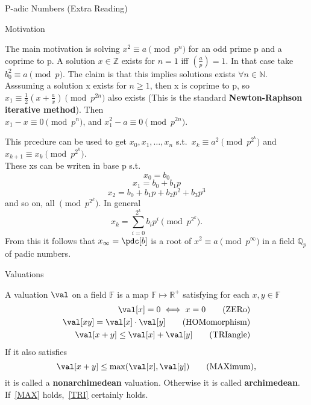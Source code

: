\documentclass[12pt, letterpaper]{article}
\newcommand{\R}{\mathbb{R}}
\newcommand{\Q}{\mathbb{Q}}
\newcommand{\Z}{\mathbb{Z}}
\newcommand{\F}{\mathbb{F}}
\newcommand{\N}{\mathbb{N}}
\begin{document}
\begin{section}{P-adic Numbers (Extra Reading)}

  \begin{subsection}{Motivation}

    The main motivation is solving \(x^{2} \equiv a \pmod{p^{n}}\) for an odd
    prime p and a coprime to p. A solution \(x \in \Z\) exists for \(n = 1\) iff
    \((\frac{a}{p}) = 1\). In that case take \(b^{2}_{0} \equiv a \pmod{p}\).
    The claim is that this implies solutions exists \(\forall n \in \N\). \\
    Asssuming a solution x exists for \(n \geq 1\), then x is coprime to p, so
    \(x_{1} \equiv \frac{1}{2} (x + \frac{a}{x}) \pmod{p^{2n}}\) also exists
    (This is the standard \textbf{Newton-Raphson iterative method}). Then \\
    \(x_{1} - x \equiv 0 \pmod{p^{n}}\), and \(x^{2}_{1} - a \equiv 0
    \pmod{p^{2n}}\).

    This prcedure can be used to get \(x_{0}, x_{1}, \dots , x_{n}\) s.t.\
    \(x_{k} \equiv a^{2} \pmod{p^{2^{k}}}\) and \(x_{k + 1} \equiv x_{k}
    \pmod{p^{2^{k}}}\). \\
    These xs can be writen in base p s.t.\
    \[x_{0} = b_{0}\] \[x_{1} = b_{0} + b_{1} p\]
    \[x_{2} = b_{0} + b_{1} p + b_{2} p^{2} + b_{3} p^{3}\]
    and so on, all \(\pmod{p^{2^{k}}}\). In general
    \[x_{k} = \sum^{2^{k}}_{i = 0} b_{i}p^{i} \pmod{p^{2^{k}}}.\]
    From this it follows that \(x_{\infty} = \pdc[b]\)
    is a root of \(x^{2} \equiv a \pmod{p^{\infty}}\) in a field \(\Q_{p}\) of
    padic numbers.

  \end{subsection}

  \begin{subsection}{Valuations}

    A valuation \(\val\) on a field \(\F\) is a map \(\F \mapsto \R^{+}\)
    satisfying for each \(x, y \in \F\)
    \begin{align*}
      \val[x] = 0 \iff x = 0 \tag{ZERo} \label{ZER} \\
      \val[xy] = \val[x] \cdot \val[y] \tag{HOMomorphism} \label{HOM} \\
      \val[x + y] \leq \val[x] + \val[y] \tag{TRIangle} \label{TRI}
    \end{align*}
    If it also satisfies \[\val[x + y] \leq \max(\val[x], \val[y]) \label{MAX}
      \tag{MAXimum},\] it is called a \textbf{nonarchimedean} valuation.
    Otherwise it is called \textbf{archimedean}. If~\ref{MAX} holds,~\ref{TRI}
    certainly holds.


\end{subsection}
\end{section}
\end{document}
